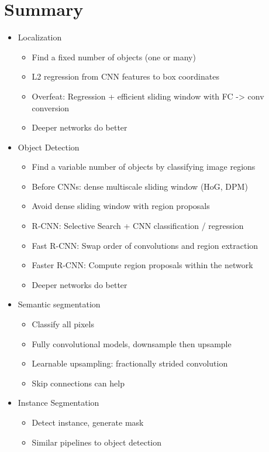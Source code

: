 \section*{Summary}
\begin{itemize}
\item Localization
\begin{itemize}
\item Find a fixed number of objects (one or many)
\item L2 regression from CNN features to box coordinates
\item Overfeat: Regression + efficient sliding window with FC -> conv conversion
\item Deeper networks do better
\end{itemize}
\item Object Detection
\begin{itemize}
\item Find a variable number of objects by classifying image regions
\item Before CNNs: dense multiscale sliding window (HoG, DPM)
\item Avoid dense sliding window with region proposals
\item R-CNN: Selective Search + CNN classification / regression
\item Fast R-CNN: Swap order of convolutions and region extraction
\item Faster R-CNN: Compute region proposals within the network
\item Deeper networks do better
\end{itemize}
\item Semantic segmentation
\begin{itemize}
\item Classify all pixels
\item Fully convolutional models, downsample then upsample
\item Learnable upsampling: fractionally strided convolution
\item Skip connections can help
\end{itemize}
\item Instance Segmentation
\begin{itemize}
\item Detect instance, generate mask
\item Similar pipelines to object detection
\end{itemize}
\end{itemize}
